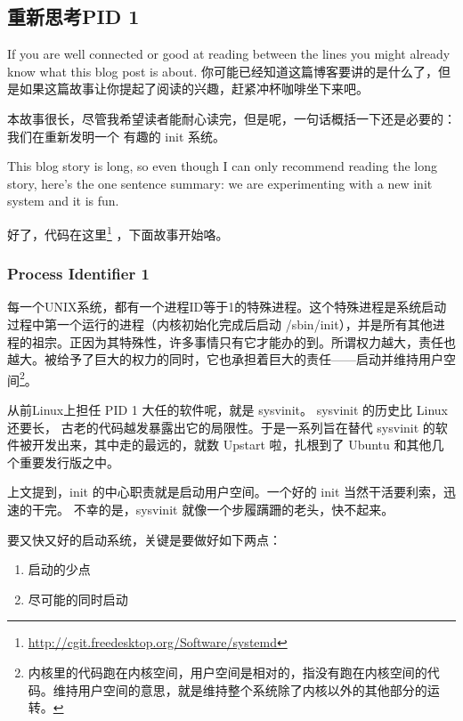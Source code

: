 \begin{insertnote}

\subsection*{重新思考PID 1}

If you are well connected or good at reading between the lines you might already
know what this blog post is about. 
你可能已经知道这篇博客要讲的是什么了，但是如果这篇故事让你提起了阅读的兴趣，赶紧冲杯咖啡坐下来吧。

本故事很长，尽管我希望读者能耐心读完，但是呢，一句话概括一下还是必要的：我们在重新发明一个 有趣的 init 系统。

This blog story is long, so even though I can only recommend reading the long story,
here's the one sentence summary: we are experimenting with a new init system and it is fun.

好了，代码在这里\footnote{\url{http://cgit.freedesktop.org/Software/systemd}} ，下面故事开始咯。


\subsubsection*{Process Identifier 1}

每一个UNIX系统，都有一个进程ID等于1的特殊进程。这个特殊进程是系统启动过程中第一个运行的进程（内核初始化完成后启动 /sbin/init），并是所有其他进程的祖宗。正因为其特殊性，许多事情只有它才能办的到。所谓权力越大，责任也越大。被给予了巨大的权力的同时，它也承担着巨大的责任——启动并维持用户空间\footnote{内核里的代码跑在内核空间，用户空间是相对的，指没有跑在内核空间的代码。维持用户空间的意思，就是维持整个系统除了内核以外的其他部分的运转。}。

从前Linux上担任 PID 1 大任的软件呢，就是 sysvinit。 sysvinit 的历史比 Linux 还要长， 古老的代码越发暴露出它的局限性。于是一系列旨在替代 sysvinit 的软件被开发出来，其中走的最远的，就数 Upstart 啦，扎根到了 Ubuntu 和其他几个重要发行版之中。

上文提到，init 的中心职责就是启动用户空间。一个好的 init 当然干活要利索，迅速的干完。
不幸的是，sysvinit 就像一个步履蹒跚的老头，快不起来。

要又快又好的启动系统，关键是要做好如下两点：

\begin{enumerate}
\item[\textbullet] 启动的少点
\item[\textbullet] 尽可能的同时启动
\end{enumerate}


\end{insertnote}
